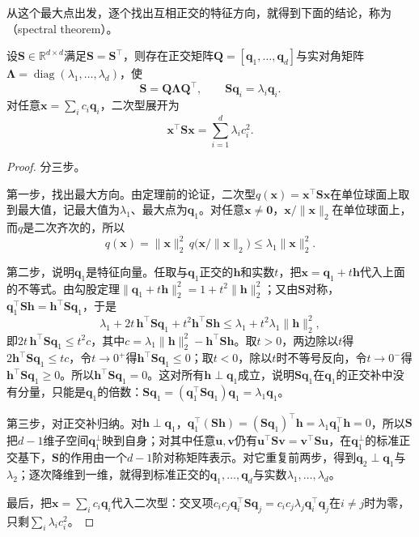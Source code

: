 从这个最大点出发，逐个找出互相正交的特征方向，就得到下面的结论，称为（spectral theorem）。

\begin{theorem}[谱定理]
\label{thm:ls-real-symmetric-spectral}
\label{thm:matrix-analysis-symmetric-spectral-theorem}
\label{sec:ch06-triangular-spectrum}
设$\bm S\in\mathbb R^{d\times d}$满足$\bm S=\bm S^\top$，则存在正交矩阵$\bm Q=[\bm q_1,\ldots,\bm q_d]$与实对角矩阵$\bm\Lambda=\operatorname{diag}(\lambda_1,\dots,\lambda_d)$，使
\begin{equation}
 \bm S=\bm Q\bm\Lambda\bm Q^\top,
 \qquad \bm S\bm q_i=\lambda_i\bm q_i.
 \label{eq:matrix-analysis-symmetric-eigendecomposition}
\end{equation}
对任意$\bm x=\sum_i c_i\bm q_i$，二次型展开为
\begin{equation}
 \bm x^\top\bm S\bm x=\sum_{i=1}^d\lambda_i c_i^2.
 \label{eq:matrix-analysis-quadratic-spectral-form}
\end{equation}
\end{theorem}

\begin{proof}
分三步。

第一步，找出最大方向。由定理前的论证，二次型$q(\bm x)=\bm x^\top\bm S\bm x$在单位球面上取到最大值，记最大值为$\lambda_1$、最大点为$\bm q_1$。对任意$\bm x\neq\bm0$，$\bm x/\lVert\bm x\rVert_2$在单位球面上，而$q$是二次齐次的，所以
\[
 q(\bm x)=\lVert\bm x\rVert_2^2\,q\bigl(\bm x/\lVert\bm x\rVert_2\bigr)\leq\lambda_1\lVert\bm x\rVert_2^2 .
\]

第二步，说明$\bm q_1$是特征向量。任取与$\bm q_1$正交的$\bm h$和实数$t$，把$\bm x=\bm q_1+t\bm h$代入上面的不等式。由勾股定理$\lVert\bm q_1+t\bm h\rVert_2^2=1+t^2\lVert\bm h\rVert_2^2$；又由$\bm S$对称，$\bm q_1^\top\bm S\bm h=\bm h^\top\bm S\bm q_1$，于是
\[
 \lambda_1+2t\,\bm h^\top\bm S\bm q_1+t^2\bm h^\top\bm S\bm h
 \leq\lambda_1+t^2\lambda_1\lVert\bm h\rVert_2^2 ,
\]
即$2t\,\bm h^\top\bm S\bm q_1\leq t^2c$，其中$c=\lambda_1\lVert\bm h\rVert_2^2-\bm h^\top\bm S\bm h$。取$t>0$，两边除以$t$得$2\bm h^\top\bm S\bm q_1\leq tc$，令$t\to0^+$得$\bm h^\top\bm S\bm q_1\leq0$；取$t<0$，除以$t$时不等号反向，令$t\to0^-$得$\bm h^\top\bm S\bm q_1\geq0$。所以$\bm h^\top\bm S\bm q_1=0$。这对所有$\bm h\perp\bm q_1$成立，说明$\bm S\bm q_1$在$\bm q_1$的正交补中没有分量，只能是$\bm q_1$的倍数：$\bm S\bm q_1=(\bm q_1^\top\bm S\bm q_1)\bm q_1=\lambda_1\bm q_1$。

第三步，对正交补归纳。对$\bm h\perp\bm q_1$，$\bm q_1^\top(\bm S\bm h)=(\bm S\bm q_1)^\top\bm h=\lambda_1\bm q_1^\top\bm h=0$，所以$\bm S$把$d-1$维子空间$\bm q_1^\perp$映到自身；对其中任意$\bm u,\bm v$仍有$\bm u^\top\bm S\bm v=\bm v^\top\bm S\bm u$，在$\bm q_1^\perp$的标准正交基下，$\bm S$的作用由一个$d-1$阶对称矩阵表示。对它重复前两步，得到$\bm q_2\perp\bm q_1$与$\lambda_2$；逐次降维到一维，就得到标准正交的$\bm q_1,\dots,\bm q_d$与实数$\lambda_1,\ldots,\lambda_d$。

最后，把$\bm x=\sum_ic_i\bm q_i$代入二次型：交叉项$c_ic_j\bm q_i^\top\bm S\bm q_j=c_ic_j\lambda_j\bm q_i^\top\bm q_j$在$i\neq j$时为零，只剩$\sum_i\lambda_ic_i^2$。
\end{proof}

